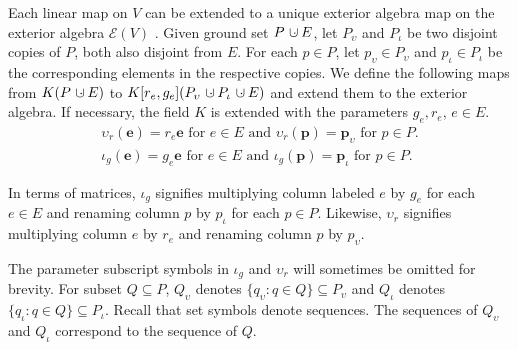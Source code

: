 \documentclass[12pt]{article}
\theoremstyle{definition}
\newtheorem{definition}[theorem]{Definition}
\newcommand{\dunion}
{\mbox{\hbox{\hskip6pt$\cdot$\hskip-5.50pt$\cup$\hskip2pt}}}
\newcommand{\epsilonfun}{\ensuremath{\epsilon}}
\newcommand{\Is}{\ensuremath{\iota}}
\newcommand{\Vs}{\ensuremath{\upsilon}}
\newcommand{\FieldK}{\ensuremath{K}}
\newcommand{\ext}[1]{\ensuremath{\mathbf{#1}}}
\begin{document}
Each linear map on $V$ can be extended to a unique exterior algebra 
map on the exterior algebra $\mathcal{E}(V)$
\cite[Theorem 7.1]{JacobsonI}.  Given ground set $P\dunion E$, let
$P_\Vs$ and $P_\Is$ be two disjoint copies of $P$, both also
disjoint from $E$.  For each $p\in P$,
let $p_\Vs\in P_\Vs$ and $p_\Is\in P_\Is$ be the corresponding elements 
in the respective copies.  We define the following maps
from $\FieldK (P\dunion E)$ to $\FieldK[r_e,g_e] (P_\Vs\dunion P_\Is\dunion E)$
and extend them to the exterior algebra.  If necessary,
the field $\FieldK$ is extended with the parameters $g_e,r_e$,
$e\in E$.
\begin{equation}
\begin{split}
\Vs_r(\ext{e}) = r_e \ext{e} \text{ for $e\in E$ and }
\Vs_r(\ext{p}) = \ext{p}_\Vs \text{ for $p\in P$.}\\
\Is_g(\ext{e}) = g_e \ext{e} \text{ for $e\in E$ and }
\Is_g(\ext{p}) = \ext{p}_\Is \text{ for $p\in P$.}
\end{split}
\end{equation}

In terms of matrices, $\Is_g$ signifies multiplying
column labeled $e$ by $g_e$ for each $e\in E$ and renaming
column $p$ by $p_\Is$ for each $p\in P$.  Likewise, $\Vs_r$
signifies multiplying
column $e$ by $r_e$ and renaming column $p$ by $p_\Vs$.

The parameter subscript symbols in $\Is_g$ and $\Vs_r$ will sometimes be
omitted for brevity.  For subset $Q\subseteq P$, 
$Q_{\Vs}$ denotes $\{q_{\Vs} : q\in Q\}\subseteq P_{\Vs}$ and 
$Q_\Is$ denotes $\{q_{\Is} : q\in Q\}\subseteq P_{\Is}$.
Recall that set symbols denote sequences.  The sequences of
$Q_{\Vs}$ and $Q_\Is$ correspond to the sequence of $Q$.

\end{document}
